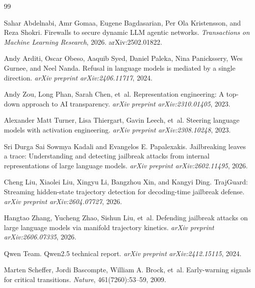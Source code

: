 \documentclass[10pt]{article}
\begin{document}
\begin{thebibliography}{99}

Sahar Abdelnabi, Amr Gomaa, Eugene Bagdasarian, Per Ola Kristensson, and Reza Shokri.
\newblock Firewalls to secure dynamic LLM agentic networks.
\newblock \emph{Transactions on Machine Learning Research}, 2026.
\newblock arXiv:2502.01822.

Andy Arditi, Oscar Obeso, Aaquib Syed, Daniel Paleka, Nina Panickssery, Wes Gurnee, and Neel Nanda.
\newblock Refusal in language models is mediated by a single direction.
\newblock \emph{arXiv preprint arXiv:2406.11717}, 2024.

Andy Zou, Long Phan, Sarah Chen, et~al.
\newblock Representation engineering: A top-down approach to AI transparency.
\newblock \emph{arXiv preprint arXiv:2310.01405}, 2023.

Alexander Matt Turner, Lisa Thiergart, Gavin Leech, et~al.
\newblock Steering language models with activation engineering.
\newblock \emph{arXiv preprint arXiv:2308.10248}, 2023.

Sri Durga Sai Sowmya Kadali and Evangelos E. Papalexakis.
\newblock Jailbreaking leaves a trace: Understanding and detecting jailbreak attacks from internal representations of large language models.
\newblock \emph{arXiv preprint arXiv:2602.11495}, 2026.

Cheng Liu, Xiaolei Liu, Xingyu Li, Bangzhou Xin, and Kangyi Ding.
\newblock TrajGuard: Streaming hidden-state trajectory detection for decoding-time jailbreak defense.
\newblock \emph{arXiv preprint arXiv:2604.07727}, 2026.

Hangtao Zhang, Yucheng Zhao, Sishun Liu, et~al.
\newblock Defending jailbreak attacks on large language models via manifold trajectory kinetics.
\newblock \emph{arXiv preprint arXiv:2606.07335}, 2026.

Qwen Team.
\newblock Qwen2.5 technical report.
\newblock \emph{arXiv preprint arXiv:2412.15115}, 2024.

Marten Scheffer, Jordi Bascompte, William A. Brock, et~al.
\newblock Early-warning signals for critical transitions.
\newblock \emph{Nature}, 461(7260):53--59, 2009.

\end{thebibliography}
\end{document}
